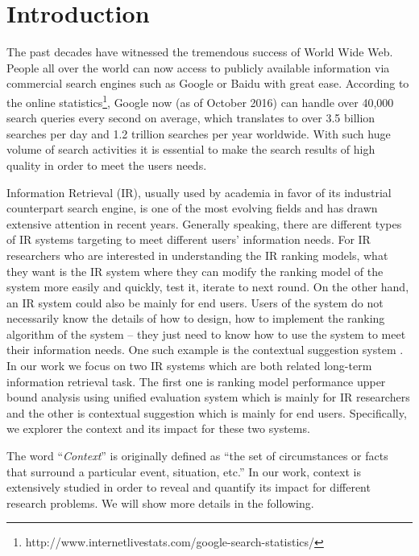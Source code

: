 %
%
\chapter{Introduction}
The past decades have witnessed the tremendous success of World Wide Web. 
People all over the world can now access to publicly available 
information via commercial search engines such as Google or Baidu 
with great ease. According to the online 
statistics\footnote{http://www.internetlivestats.com/google-search-statistics/}, 
Google now (as of October 2016) can handle over 40,000 search queries 
every second on average, which translates to over 3.5 billion searches 
per day and 1.2 trillion searches per year worldwide. 
With such huge volume of search activities it is essential to make the 
search results of high quality in order to meet the users needs.

Information Retrieval (IR), usually used by academia in favor of its 
industrial counterpart search engine, is one of the most evolving fields 
and has drawn extensive attention in recent years.
Generally speaking, there are different types of IR systems targeting to meet 
different users' information needs. 
For IR researchers who are interested in understanding the IR ranking models, 
what they want is the IR system where they can modify the ranking model of 
the system more easily and quickly, test it, iterate to next round.
On the other hand, an IR system could also be mainly for end users. 
Users of the system do not necessarily know the details of how to design, 
how to implement the ranking algorithm of the system -- they just need to know 
how to use the system to meet their information needs. One such example is 
the contextual suggestion system 
\cite{udel:treccs2013, udel:treccs2014, udel:treccs2015, 
Yang:2013:OUP:2499178.2499191, Yang2015}.
In our work we focus on two IR systems which are both related long-term 
information retrieval task. The first one is ranking model performance 
upper bound analysis using unified evaluation system which is mainly for 
IR researchers and the other is contextual suggestion which is mainly for 
end users. Specifically, we explorer the context and its impact for these 
two systems.

The word ``\textit{Context}'' is originally defined as 
``the set of circumstances or facts that surround a particular event, situation, etc.''
In our work, context is extensively studied in order to reveal and quantify 
its impact for different research problems. We will show more details 
in the following.

